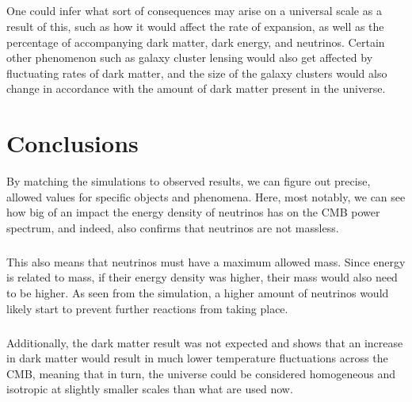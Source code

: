 \documentclass[twoside, fontsize=12pt,
     bibliography=totoc, %
     listof=totoc, %
     index=totoc, %
     onehalfspacing %
]{_MScDiss2017_cls}
\begin{document}
\paragraph{}
One could infer what sort of consequences may arise on a universal scale as a result of this, such as how it would affect the rate of expansion, as well as the percentage of accompanying dark matter, dark energy, and neutrinos. Certain other phenomenon such as galaxy cluster lensing would also get affected by fluctuating rates of dark matter, and the size of the galaxy clusters would also change in accordance with the amount of dark matter present in the universe.




\chapter{Conclusions}

By matching the simulations to observed results, we can figure out precise, allowed values for specific objects and phenomena. Here, most notably, we can see how big of an impact the energy density of neutrinos has on the CMB power spectrum, and indeed, also confirms that neutrinos are not massless.

\paragraph{}

This also means that neutrinos must have a maximum allowed mass. Since energy is related to mass, if their energy density was higher, their mass would also need to be higher. As seen from the simulation, a higher amount of neutrinos would likely start to prevent further reactions from taking place.

\paragraph{}

Additionally, the dark matter result was not expected and shows that an increase in dark matter would result in much lower temperature fluctuations across the CMB, meaning that in turn, the universe could be considered homogeneous and isotropic at slightly smaller scales than what are used now.
\end{document}
